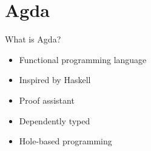 \documentclass{beamer}
\theoremstyle{definition}
\begin{document}

  \section{Agda}
  \begin{frame}{What is Agda?}
    \begin{itemize}
      \item Functional programming language \pause
      \item Inspired by Haskell  \pause
      \item Proof assistant \pause
      \item Dependently typed \pause
      \item Hole-based programming
    \end{itemize}
  \end{frame}
\end{document}
